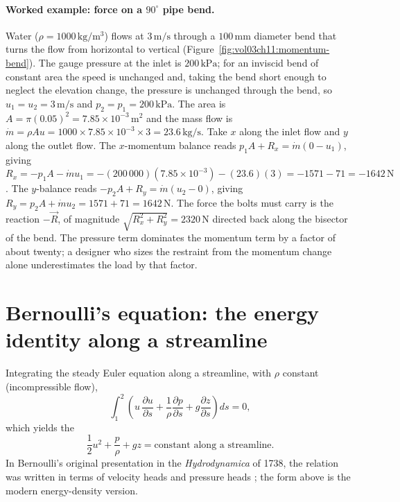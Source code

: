 \paragraph{Worked example: force on a $90^\circ$ pipe bend.} Water
($\rho = 1000\,\si{\kilogram\per\meter\cubed}$) flows at
$3\,\si{\meter\per\second}$ through a $100\,\si{\milli\meter}$
diameter bend that turns the flow from horizontal to vertical
(Figure~\ref{fig:vol03ch11:momentum-bend}). The gauge pressure at the
inlet is $200\,\text{kPa}$; for an inviscid bend of constant area the
speed is unchanged and, taking the bend short enough to neglect the
elevation change, the pressure is unchanged through the bend, so
$u_1 = u_2 = 3\,\si{\meter\per\second}$ and $p_2 = p_1 =
200\,\text{kPa}$. The area is $A = \pi(0.05)^2 = 7.85\times
10^{-3}\,\si{\meter}^2$ and the mass flow is $\dot{m} = \rho A u =
1000\times 7.85\times 10^{-3}\times 3 = 23.6\,\si{\kilogram\per
\second}$. Take $x$ along the inlet flow and $y$ along the outlet
flow. The $x$-momentum balance reads $p_1 A + R_x = \dot{m}(0 - u_1)$,
giving $R_x = -p_1 A - \dot{m}u_1 = -(200\,000)(7.85\times 10^{-3}) -
(23.6)(3) = -1571 - 71 = -1642\,\si{\newton}$. The $y$-balance reads
$-p_2 A + R_y = \dot{m}(u_2 - 0)$, giving $R_y = p_2 A + \dot{m}u_2 =
1571 + 71 = 1642\,\si{\newton}$. The force the bolts must carry is the
reaction $-\vec{R}$, of magnitude $\sqrt{R_x^2 + R_y^2} =
2320\,\si{\newton}$ directed back along the bisector of the bend. The
pressure term dominates the momentum term by a factor of about
twenty; a designer who sizes the restraint from the momentum change
alone underestimates the load by that factor.

\section{Bernoulli's equation: the energy identity along a streamline}

Integrating the steady Euler equation along a streamline, with
$\rho$ constant (incompressible flow),
\[
\int_1^2 \left(u\,\frac{\partial u}{\partial s}
+ \frac{1}{\rho}\frac{\partial p}{\partial s}
+ g\frac{\partial z}{\partial s}\right) ds = 0,
\]
which yields the 
\[
\frac{1}{2}u^2 + \frac{p}{\rho} + gz = \text{constant along a
streamline}.
\]
In Bernoulli's original presentation in the \emph{Hydrodynamica} of
1738, the relation was written in terms of velocity heads and
pressure heads
\cite[Section XII]{hist:bernoulli1738}; the form above is the
modern energy-density version.

